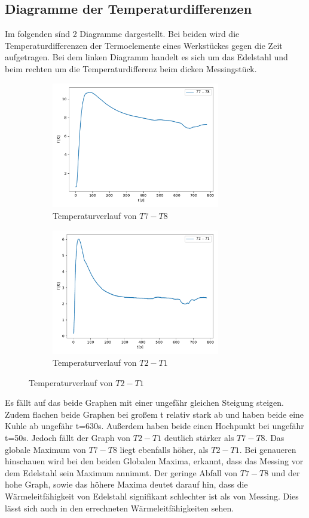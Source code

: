         \subsection{Diagramme der Temperaturdifferenzen}
    \noindent
    Im folgenden sínd 2 Diagramme dargestellt. Bei beiden wird die Temperaturdifferenzen der Termoelemente eines Werkstückes gegen die Zeit aufgetragen. Bei dem linken Diagramm handelt es sich um das Edelstahl und beim rechten um die Temperaturdifferenz beim dicken Messingstück.
    \begin{figure}
        \begin{subfigure}{0.48\textwidth}
               \centering
               \includegraphics[height=5.5cm]{Daten/grafic1.pdf}
               \caption{Temperaturverlauf von $T7-T8$}
               \label{fig:static_T7-T8}
        \end{subfigure}
    \hfill
        \begin{subfigure}{0.48\textwidth}
               \centering
               \includegraphics[height=5.5cm]{Daten/grafic2.pdf}
               \caption{Temperaturverlauf von $T2-T1$}
               \label{fig:static_T2-T1}
        \end{subfigure}
    \end{figure}
\noindent
    Es fällt auf das beide Graphen mit einer ungefähr gleichen Steigung steigen. Zudem flachen beide Graphen bei großem t relativ stark ab und haben beide eine \glqq Kuhle \grqq{} ab ungefähr t=630s.
    Außerdem haben beide einen Hochpunkt bei ungefähr t=50s. 
\noindent
Jedoch fällt der Graph von $T2-T1$ deutlich stärker als $T7-T8$. Das globale Maximum von $T7-T8$ liegt ebenfalls höher, als $T2-T1$. Bei genaueren hinschauen wird bei den beiden Globalen Maxima,
    erkannt, dass das Messing vor dem Edelstahl sein Maximum annimmt. 
\noindent
    Der geringe Abfall von $T7-T8$ und der hohe Graph, sowie das höhere Maxima deutet darauf hin, dass die Wärmeleitfähigkeit von Edelstahl signifikant schlechter ist als von Messing. Dies lässt sich auch in den
    errechneten Wärmeleitfähigkeiten sehen.
\newpage
